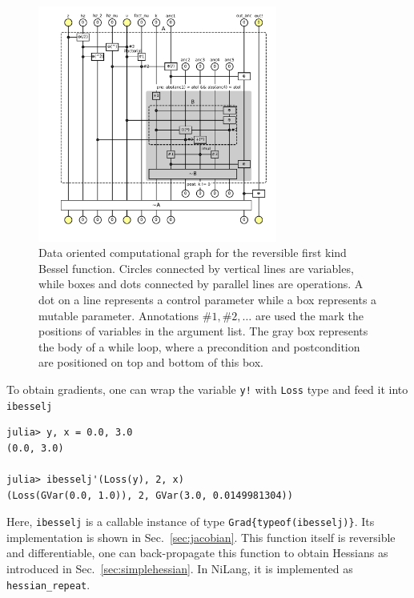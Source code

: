\documentclass[aps,twocolumn,longbibliography,english,superscriptaddress]{revtex4-1}
\newcommand{\<}{\langle}
\renewcommand{\>}{\rangle}
\newcommand{\Sec}[1]{Sec.~\ref{#1}}
\theoremstyle{definition}\newtheorem{definition}{\textit{Definition}}
\begin{document}
\begin{figure}
    \centerline{\includegraphics[width=0.7\textwidth,trim={1cm 1cm 0 0},clip]{images/fig4.pdf}}
    \caption{Data oriented computational graph for the reversible first kind Bessel function. Circles connected by vertical lines are variables, while boxes and dots connected by parallel lines are operations. A dot on a line represents a control parameter while a box represents a mutable parameter. Annotations $\#1, \#2, \ldots$ are used the mark the positions of variables in the argument list. The gray box represents the body of a while loop, where a precondition and postcondition are positioned on top and bottom of this box.}\label{fig:datagraph}
\end{figure}

To obtain gradients, one can wrap the variable \texttt{y!} with \texttt{Loss} type and feed it into \texttt{ibesselj\textquotesingle}

\begin{minipage}{.44\textwidth}
\begin{lstlisting}
julia> y, x = 0.0, 3.0
(0.0, 3.0)

julia> ibesselj'(Loss(y), 2, x)
(Loss(GVar(0.0, 1.0)), 2, GVar(3.0, 0.0149981304))
\end{lstlisting}
\end{minipage}

Here, \texttt{ibesselj\textquotesingle} is a callable instance of type \texttt{Grad\{typeof(ibesselj)\}}. Its implementation is shown in \Sec{sec:jacobian}. This function itself is reversible and differentiable, one can back-propagate this function to obtain Hessians as introduced in \Sec{sec:simplehessian}. In NiLang, it is implemented as \texttt{hessian\_repeat}.
\end{document}
